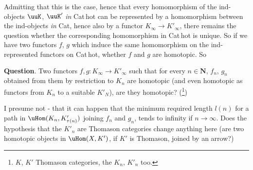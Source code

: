 Admitting that this is the case, hence that every homomorphism of the ind-objects $\uuK$, $\uuK'$ \textit{in} Cat\,hot can be represented by a homomorphism between the ind-objects \textit{in} Cat, hence also by a functor $K_\infty \longrightarrow K'_\infty$, there remains the question whether the corresponding homomorphism in Cat\,hot is unique. So if we have two functors $f$, $g$ which induce the same homomorphism on the ind-represented functors on Cat\,hot, whether $f$ and $g$ are homotopic. So

\textbf{Question}. Two functors $f, g : K_\infty \longrightarrow K'_\infty$ such that for every $n \in \mathbf{N}$, $f_n$, $g_n$ obtained from them by restriction to $K_n$ are homotopic (and even homotopic as functors from $K_n$ to a suitable $K'_N$), are they homotopic? (\footnote[8]{$K$, $K'$ Thomason categories, the $K_n$, $K'_n$ too.})

I presume not - that it can happen that the minimum required length $l(n)$ for a path in $\uHom(K_n, K'_{\tau(n)})$ joining $f_n$ and $g_n$, tends to infinity if $n \longrightarrow \infty$. Does the hypothesis that the $K'_n$ are Thomason categories change anything here (are two homotopic objects in $\uHom(X, K')$, if $K'$ is Thomason, joined by an arrow?)

